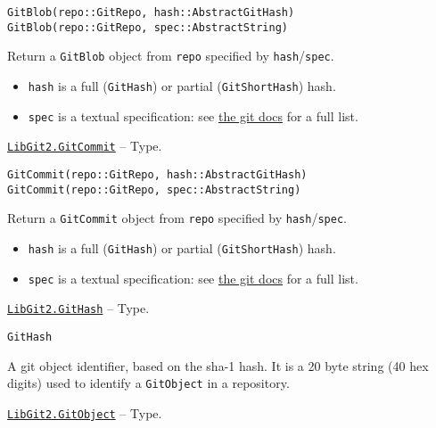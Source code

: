 \begin{adjustwidth}{2em}{0pt}


\begin{verbatim}
GitBlob(repo::GitRepo, hash::AbstractGitHash)
GitBlob(repo::GitRepo, spec::AbstractString)
\end{verbatim}

Return a \texttt{GitBlob} object from \texttt{repo} specified by \texttt{hash}/\texttt{spec}.

\begin{itemize}
\item \texttt{hash} is a full (\texttt{GitHash}) or partial (\texttt{GitShortHash}) hash.


\item \texttt{spec} is a textual specification: see \href{https://git-scm.com/docs/git-rev-parse.html\#\_specifying\_revisions}{the git docs} for a full list.

\end{itemize}


\end{adjustwidth}
\hypertarget{5346527129202716606}{}
\hyperlink{5346527129202716606}{\texttt{LibGit2.GitCommit}}  -- {Type.}

\begin{adjustwidth}{2em}{0pt}


\begin{verbatim}
GitCommit(repo::GitRepo, hash::AbstractGitHash)
GitCommit(repo::GitRepo, spec::AbstractString)
\end{verbatim}

Return a \texttt{GitCommit} object from \texttt{repo} specified by \texttt{hash}/\texttt{spec}.

\begin{itemize}
\item \texttt{hash} is a full (\texttt{GitHash}) or partial (\texttt{GitShortHash}) hash.


\item \texttt{spec} is a textual specification: see \href{https://git-scm.com/docs/git-rev-parse.html\#\_specifying\_revisions}{the git docs} for a full list.

\end{itemize}


\end{adjustwidth}
\hypertarget{202290709580230708}{}
\hyperlink{202290709580230708}{\texttt{LibGit2.GitHash}}  -- {Type.}

\begin{adjustwidth}{2em}{0pt}


\begin{verbatim}
GitHash
\end{verbatim}

A git object identifier, based on the sha-1 hash. It is a 20 byte string (40 hex digits) used to identify a \texttt{GitObject} in a repository.



\end{adjustwidth}
\hypertarget{4668198389828625678}{}
\hyperlink{4668198389828625678}{\texttt{LibGit2.GitObject}}  -- {Type.}

